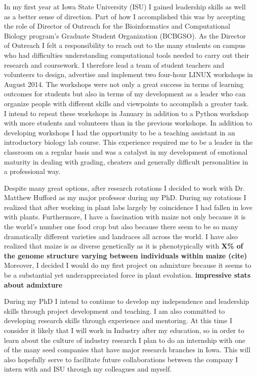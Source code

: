 \documentclass[12pt]{amsart}
\begin{document}
In my first year at Iowa State University (ISU) I gained leadership skills as well as a better sense of direction.  
Part of how I accomplished this was by accepting the role of Director of Outreach for the Bioinformatics and Computational Biology program's Graduate Student Organization (BCBGSO).
As the Director of Outreach I felt a responsibility to reach out to the many students on campus who had difficulties understanding computational tools needed to carry out their research and coursework.
I therefore lead a team of student teachers and volunteers to design, advertise and implement two four-hour LINUX workshops in August 2014.
The workshops were not only a great success in terms of learning outcomes for students but also in terms of my development as a leader who can organize people with different skills and viewpoints to accomplish a greater task.
I intend to repeat these workshops in January in addition to a Python workshop with more students and volunteers than in the previous workshops.  
In addition to developing workshops I had the opportunity to be a teaching assistant in an introductory biology lab course.
This experience required me to be a leader in the classroom on a regular basis and was a catalyst in my development of emotional maturity in dealing with grading, cheaters and generally difficult personalities in a professional way.

Despite many great options, after research rotations I decided to work with Dr. Matthew Hufford as my major professor during my PhD.
During my rotations I realized that after working in plant labs largely by coincidence I had fallen in love with plants.
Furthermore, I have a fascination with maize not only because it is the world's number one food crop but also because there seem to be so many dramatically different varieties and landraces all across the world.
I have also realized that maize is as diverse genetically as it is phenotypically with \textbf{X\% of the genome structure varying between individuals within maize (cite)}
Moreover, I decided I would do my first project on admixture because it seems to be a substantial yet underappreciated force in plant evolution.
\textbf{impressive stats about admixture}

During my PhD I intend to continue to develop my independence and leadership skills through project development and teaching.  
I am also committed to developing research skills through experience and mentoring.  
At this time I consider it likely that I will work in Industry after my education, so in order to learn about the culture of industry research I plan to do an internship with one of the many seed companies that have major research branches in Iowa.
This will also hopefully serve to facilitate future collaborations between the company I intern with and ISU through my colleagues and myself.
\end{document}
